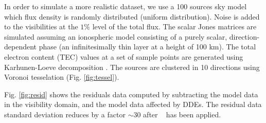 In order to simulate a more realistic dataset, we use a 100 sources
sky model which flux density is randomly distributed (uniform
distribution). Noise is added to the visibilities at the $1\%$ level
of the total flux. The scalar Jones matrices are simulated assuming an
ionospheric model consisting of a purely scalar, direction-dependent
phase (an infinitesimally thin layer at a height of 100 km). The total
electron content (TEC) values at a set of sample points are generated
using Karhunen-Loeve decomposition \citep[the spatial correlation is
  given by Kolmogorov turbulence, see][]{Tol09}. The sources are
clustered in 10 directions using Voronoi tesselation
(Fig. \ref{fig:tessel}).

Fig. \ref{fig:resid} shows the residuals data computed by subtracting
the model data in the visibility domain, and the model data affected
by DDEs. The residual data standard deviation reduces by a factor
$\sim30$ after \COH~ has been applied.




